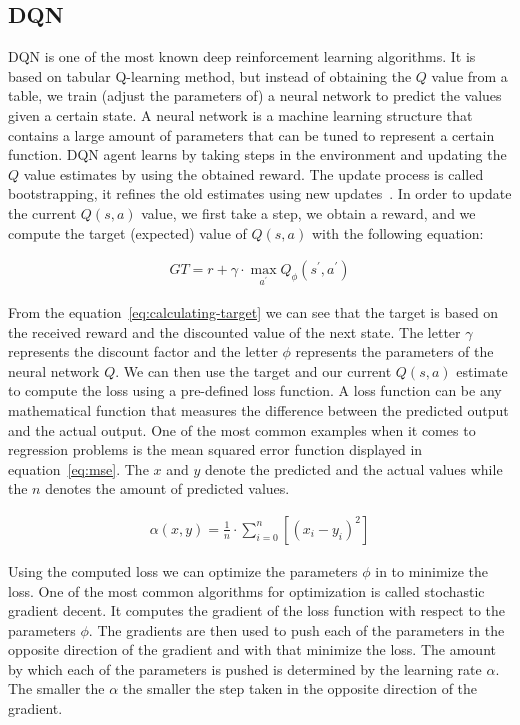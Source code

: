 \documentclass{article}
\begin{document}
\subsection{DQN}
\label{subsec:dqn}
DQN is one of the most known deep reinforcement learning algorithms.
It is based on tabular Q-learning method, but instead of obtaining the $Q$ value from a table,
we train (adjust the parameters of) a neural network to predict the values given a certain state.
A neural network is a machine learning structure that contains a large amount of parameters that can be tuned
to represent a certain function.
DQN agent learns by taking steps in the environment and updating the $Q$ value estimates by using the obtained reward.
The update process is called bootstrapping, it refines the old estimates using new updates~\cite{DBLP:books/sp/Plaat22}.
In order to update the current $Q(s,a)$ value, we first take a step, we obtain a reward, and we compute the target
(expected) value of $Q(s,a)$ with the following equation:

\begin{align}
   \label{eq:calculating-target}
    GT = r + \gamma \cdot \max_{a^\prime} Q_{\phi}(s^\prime, a^\prime)
\end{align}

From the equation~\ref{eq:calculating-target} we can see that the target is based on the received reward and the discounted
value of the next state.
The letter $\gamma$ represents the discount factor and the letter $\phi$ represents the parameters of the neural network $Q$.
We can then use the target and our current $Q(s,a)$ estimate to compute the loss using a pre-defined loss function.
A loss function can be any mathematical function that measures the difference between the predicted output and the
actual output.
One of the most common examples when it comes to regression problems is the mean squared error function displayed
in equation~\ref{eq:mse}.
The $x$ and $y$ denote the predicted and the actual values while the $n$ denotes the amount of predicted values.

\begin{align}
   \label{eq:mse}
   \alpha(x, y) = \frac{1}{n} \cdot \sum_{i = 0}^{n} [(x_i - y_i)^2]
\end{align}

Using the computed loss we can optimize the parameters $\phi$ in to minimize the loss.
One of the most common algorithms for optimization is called stochastic gradient decent.
It computes the gradient of the loss function with respect to the parameters $\phi$.
The gradients are then used to push each of the parameters in the opposite direction of the gradient and with that minimize
the loss.
The amount by which each of the parameters is pushed is determined by the learning rate $\alpha$.
The smaller the $\alpha$ the smaller the step taken in the opposite direction of the gradient.
\end{document}
